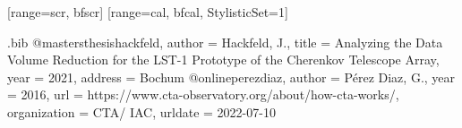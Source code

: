 
\DeclareSIUnit{}

\usetikzlibrary{overlay-beamer-styles,calc,tikzmark,decorations.pathreplacing}

[range={scr, bfscr}]
[range={cal, bfcal}, StylisticSet=1]

\begin{filecontents*}{\jobname.bib}
@mastersthesis{hackfeld,
  author      = {Hackfeld, J.},
  title       = {Analyzing the Data Volume Reduction for the LST-1 Prototype of the Cherenkov Telescope Array},
  year        = {2021},
  address     = {Bochum}
}
@online{perezdiaz,
  author       = {Pérez Diaz, G.},
  year         = {2016},
  url          = {https://www.cta-observatory.org/about/how-cta-works/},
  organization = {CTA/ IAC},
  urldate      = {2022-07-10}
}
\end{filecontents*}



\newcommand{\roundpic}[6][]{%
  \node [circle, draw, color=tugreen, minimum width = #2,
    path picture = {
      \node [#1] at (path picture bounding box.center) {
        \texttt{[image: \#4]}};
    }] at (#5,#6) {};}%

\renewcommand{\vec}[1]{\mathbf{#1}}


\newcommand{\yaml}[2]{%
  \texttt{\textcolor{#1}{\detokenize{#2}}}%
}